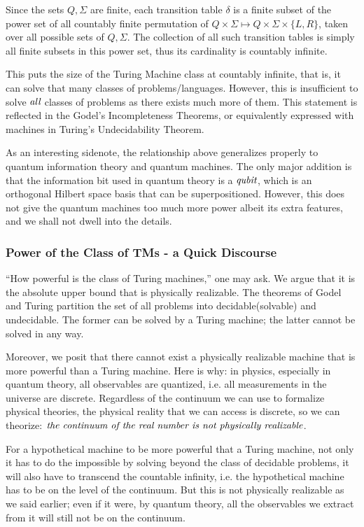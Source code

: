 \documentclass[12pt]{article}  %
\begin{document}
Since the sets $Q, \Sigma$ are finite, each transition table $\delta$ is a finite subset of the power set of all countably finite permutation of $Q \times \Sigma \mapsto Q \times \Sigma \times \{L, R\}$, taken over all possible sets of $Q, \Sigma$. The collection of all such transition tables is simply all finite subsets in this power set, thus its cardinality is countably infinite.

This puts the size of the Turing Machine class at countably infinite, that is, it can solve that many classes of problems/languages. However, this is insufficient to solve $\emph{all}$ classes of problems as there exists much more of them. This statement is reflected in the Godel's Incompleteness Theorems, or equivalently expressed with machines in Turing's Undecidability Theorem.

As an interesting sidenote, the relationship above generalizes properly to quantum information theory and quantum machines. The only major addition is that the information bit used in quantum theory is a $\emph{qubit}$, which is an orthogonal Hilbert space basis that can be superpositioned. However, this does not give the quantum machines too much more power albeit its extra features, and we shall not dwell into the details.





\subsubsection{Power of the Class of TMs - a Quick Discourse}
``How powerful is the class of Turing machines,'' one may ask. We argue that it is the absolute upper bound that is physically realizable. The theorems of Godel and Turing partition the set of all problems into decidable(solvable) and undecidable. The former can be solved by a Turing machine; the latter cannot be solved in any way.

Moreover, we posit that there cannot exist a physically realizable machine that is more powerful than a Turing machine. Here is why: in physics, especially in quantum theory, all observables are quantized, i.e. all measurements in the universe are discrete. Regardless of the continuum we can use to formalize physical theories, the physical reality that we can access is discrete, so we can theorize: $\emph{the continuum of the real number is not physically realizable}$.

For a hypothetical machine to be more powerful that a Turing machine, not only it has to do the impossible by solving beyond the class of decidable problems, it will also have to transcend the countable infinity, i.e. the hypothetical machine has to be on the level of the continuum. But this is not physically realizable as we said earlier; even if it were, by quantum theory, all the observables we extract from it will still not be on the continuum.
\end{document}
